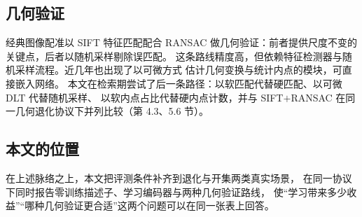 \subsection{几何验证}

经典图像配准以 SIFT\cite{lowe2004sift} 特征匹配配合 RANSAC\cite{fischler1981ransac}
做几何验证：前者提供尺度不变的关键点，后者以随机采样剔除误匹配。
这条路线精度高，但依赖特征检测器与随机采样流程。近几年也出现了以可微方式
估计几何变换与统计内点的模块，可直接嵌入网络。
本文在检索期尝试了后一条路径：以软匹配代替硬匹配、以可微 DLT 代替随机采样、
以软内点占比代替硬内点计数，并与 SIFT$+$RANSAC 在同一几何退化协议下并列比较（第 4.3、5.6 节）。

\subsection{本文的位置}

在上述脉络之上，本文把评测条件补齐到退化与开集两类真实场景，
在同一协议下同时报告零训练描述子、学习编码器与两种几何验证路线，
使“学习带来多少收益”“哪种几何验证更合适”这两个问题可以在同一张表上回答。
